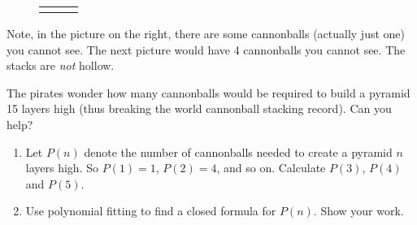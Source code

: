 \documentclass[10pt,]{book}
\theoremstyle{plain}
\theoremstyle{definition}
\theoremstyle{definition}
\theoremstyle{definition}
\numberwithin{equation}{chapter}
\newlength{\panelmax}
\begin{document}
\begin{exerciselist}
{{{{
}
}}
\newlength{\phAYimage}\setlength{\phAYimage}{\ht\panelboxAYimage+\dp\panelboxAYimage}
\settototalheight{\phAYimage}{\usebox{\panelboxAYimage}}
\setlength{\panelmax}{\maxof{\panelmax}{\phAYimage}}
\leavevmode%
\setlength{\tabcolsep}{0.0416666666666667\textwidth}
\begin{figure}
\hspace*{0.0416666666666667\textwidth}%
\begin{tabular}{@{}*{3}{c}@{}}
\begin{minipage}[c][\panelmax][b]{0.15\textwidth}\usebox{\panelboxAWimage}\end{minipage}&
\begin{minipage}[c][\panelmax][b]{0.25\textwidth}\usebox{\panelboxAXimage}\end{minipage}&
\begin{minipage}[c][\panelmax][b]{0.35\textwidth}\usebox{\panelboxAYimage}\end{minipage}\end{tabular}
\end{figure}
}%
\par

            Note, in the picture on the right, there are some cannonballs (actually just one) you cannot see. The next picture would have 4 cannonballs you cannot see. The stacks are \emph{not} hollow.
\par

            The pirates wonder how many cannonballs would be required to build a pyramid 15 layers high (thus breaking the world cannonball stacking record). Can you help?
\leavevmode%
\begin{enumerate}[label=(\alph*)]
\item\hypertarget{li-1028}{}
                Let \(P(n)\) denote the number of cannonballs needed to create a pyramid \(n\) layers high. So \(P(1) = 1\), \(P(2) = 4\), and so on. Calculate \(P(3)\), \(P(4)\) and \(P(5)\).


\item\hypertarget{li-1029}{}
                Use polynomial fitting to find a closed formula for \(P(n)\). Show your work.



\end{enumerate}
\end{exerciselist}
\end{document}
